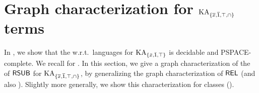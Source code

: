 \newcommand{\FillQ}{\mathcal{Q}}

\newcommand{\gfun}{g}
\newcommand{\allgraph}{\mathrm{GR}}
\newcommand{\vgraph}{\mathrm{\graph}}
\section{Graph characterization for $\mathrm{KA}_{\{\overline{x}, \overline{\mathsf{1}}, \top, \cap\}}$ terms}\label{section: graph}
In , we show that the  w.r.t.\ languages for $\mathrm{KA}_{\{\bar{x}, \bar{\mathsf{1}}, \top\}}$ is decidable and PSPACE-complete.
We recall  for .
In this section, we give a graph characterization of the  of $\mathsf{RSUB}$ for $\mathrm{KA}_{\{\overline{x}, \overline{\mathsf{1}}, \top, \cap\}}$,
by generalizing the graph characterization of $\mathsf{REL}$ \cite[Thm.\  18]{nakamuraExistentialCalculiRelations2023} (and also \cite{andrekaEquationalTheoryUnionfree1995,brunetPetriAutomataKleene2015,brunetPetriAutomata2017}).
Slightly more generally, we show this characterization for \emph{} classes ().

